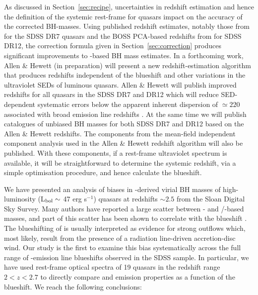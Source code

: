 As discussed in Section~\ref{sec:recipe}, uncertainties in redshift estimation and hence the definition of the systemic rest-frame for quasars impact on the accuracy of the corrected BH-masses.
Using published redshift estimates, notably those from \citet{hewett10} for the SDSS DR7 quasars and the BOSS PCA-based redshifts from \citet{paris17} for SDSS DR12, the correction formula given in Section~\ref{sec:correction} produces significant improvements to -based BH mass estimates.
In a forthcoming work, Allen \& Hewett (in preparation) will present a new redshift-estimation algorithm that produces redshifts independent of the  blueshift and other variations in the ultraviolet SEDs of luminous quasars.
Allen \& Hewett will publish improved redshifts for all quasars in the SDSS DR7 and DR12 which will reduce SED-dependent systematic errors below the apparent inherent dispersion of $\simeq220$\kms associated with broad emission line redshifts \citep{shen16b}.
At the same time we will publish catalogues of unbiased BH masses for both SDSS DR7 and DR12 based on the Allen \& Hewett redshifts. 
The components from the mean-field independent component analysis \citep[see][for an application to astronomical spectra]{allen13} used in the Allen \& Hewett redshift algorithm will also be published.
With these components, if a rest-frame ultraviolet spectrum is available, it will be straightforward to determine the systemic redshift, via a simple optimisation procedure, and hence calculate the  blueshift. 

We have presented an analysis of biases in -derived virial BH masses of high-luminosity (L$_{\rm{bol}} \sim$ 47 erg s$^{-1}$) quasars at redshifts $\sim2.5$ from the Sloan Digital Sky Survey. 
Many authors have reported a large scatter between - and \hans/\hbns-based masses, and part of this scatter has been shown to correlate with the  blueshift \citep{shen12}.
The blueshifting of  is usually interpreted as evidence for strong outflows which, most likely, result from the presence of a radiation line-driven accretion-disc wind. 
Our study is the first to examine this bias systematically across the full range of -emission line blueshifts observed in the SDSS sample. 
In particular, we have used rest-frame optical spectra of 19 quasars in the redshift range $2 < z < 2.7$ to directly compare  and \ha emission properties as a function of the  blueshift. 
We reach the following conclusions:

